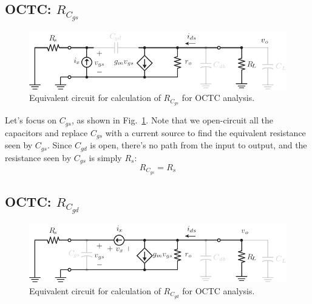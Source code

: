 \subsection{OCTC:  $R_{C_{gs}}$}

\begin{figure}[tb]
\begin{center}
\includegraphics[scale=1]{cs_amp_ac_caps_Cgs}
\end{center}
\caption{Equivalent circuit for calculation of $R_{C_{gs}}$ for OCTC analysis.} \label{fig:cs_amp_ac_caps_Cgs}
\end{figure}

Let's focus on $C_{gs}$, as shown in Fig.~\ref{fig:cs_amp_ac_caps_Cgs}. Note that we open-circuit all the capacitors and replace $C_{gs}$ with a current source to find the equivalent resistance seen by $C_{gs}$.
 Since $C_{gd}$ is open, there's no path from the input to output, and the resistance seen by $C_{gs}$ is simply $R_s$:
%
\begin{equation}
	{R_{C_{gs}}} = R_{s}
\end{equation}


\subsection{OCTC:  $R_{C_{gd}}$}

\begin{figure}[tb]
\begin{center}
\includegraphics[scale=1]{cs_amp_ac_caps_Cgd}
\end{center}
\caption{Equivalent circuit for calculation of $R_{C_{gd}}$ for OCTC analysis.} \label{fig:cs_amp_ac_caps_Cgd}
\end{figure}
 
